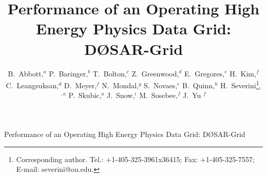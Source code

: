 \documentclass{revtex4}
\newcommand{\DO}{\mbox{D\O}}
\begin{document}
\markboth{\DO SAR}
{Performance of an Operating High Energy Physics Data Grid: \DO SAR-Grid}

%
%

\title{Performance of an Operating High Energy Physics Data Grid: \DO SAR-Grid}


\author{\footnotesize B.~Abbott,$^a$ P.~Baringer,$^b$ T.~Bolton,$^c$ 
Z.~Greenwood,$^d$ E.~Gregores,$^e$ H.~Kim,$^f$ C.~Leangsuksan,$^d$ 
D.~Meyer,$^f$ N.~Mondal,$^g$ S.~Novaes,$^e$ B.~Quinn,$^h$ 
H.~Severini\footnote{Corresponding author. Tel.: +1-405-325-3961x36415; Fax: +1-405-325-7557; E-mail: \mbox{severini@ou.edu}.},$^{,a}$
P.~Skubic,$^a$ J.~Snow,$^i$ M.~Sosebee,$^f$ J.~Yu $^f$}

\address{$^a$University of Oklahoma, Norman, OK 73019, USA\\
$^b$University of Kansas, Lawrence, KS 66045, USA\\
$^c$Kansas State University, Manhattan, KS 66506, USA\\
$^d$Louisiana Tech University, Ruston, LA 71272, USA\\
$^e$Universidade Estadual Paulista, Sao Paulo, Brazil\\
$^f$University of Texas at Arlington, Arlington, TX 76019, USA\\
$^g$Tata Institute of Fundamental Research, Bombay, India\\
$^h$The University of Mississippi, University, MS 38677, USA\\
$^i$Langston University, Langston, OK  73050, USA} 



\end{document}
